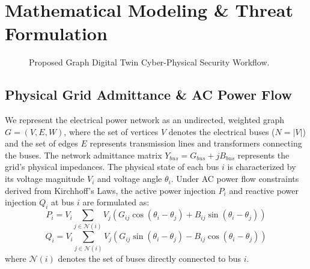 \documentclass[journal]{IEEEtran}
\begin{document}
\section{Mathematical Modeling \& Threat Formulation}

\begin{figure}[htbp]
\centering
{}
\caption{Proposed Graph Digital Twin Cyber-Physical Security Workflow.}
\label{fig:flowchart}
\end{figure}

\subsection{Physical Grid Admittance \& AC Power Flow}
We represent the electrical power network as an undirected, weighted graph $G = (V, E, W)$, where the set of vertices $V$ denotes the electrical buses ($N = |V|$) and the set of edges $E$ represents transmission lines and transformers connecting the buses. The network admittance matrix $Y_{bus} = G_{bus} + jB_{bus}$ represents the grid's physical impedances. The physical state of each bus $i$ is characterized by its voltage magnitude $V_i$ and voltage angle $\theta_i$. Under AC power flow constraints derived from Kirchhoff's Laws, the active power injection $P_i$ and reactive power injection $Q_i$ at bus $i$ are formulated as:
\begin{equation}
P_i = V_i \sum_{j \in \mathcal{N}(i)} V_j \left( G_{ij} \cos(\theta_i - \theta_j) + B_{ij} \sin(\theta_i - \theta_j) \right)
\end{equation}
\begin{equation}
Q_i = V_i \sum_{j \in \mathcal{N}(i)} V_j \left( G_{ij} \sin(\theta_i - \theta_j) - B_{ij} \cos(\theta_i - \theta_j) \right)
\end{equation}
where $\mathcal{N}(i)$ denotes the set of buses directly connected to bus $i$.
\end{document}
